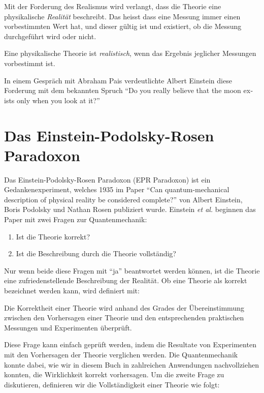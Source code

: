 \begin{refsection}
Mit der Forderung des Realismus wird verlangt, dass die Theorie eine
physikalische \emph{Realit\"at} beschreibt.
Das heisst dass eine Messung immer einen vorbestimmten Wert hat, und dieser
g\"ultig ist und existiert, ob die Messung durchgef\"uhrt wird oder nicht.

\begin{definition}\label{def:bell:realismus}
    Eine physikalische Theorie ist \emph{realistisch}, wenn das Ergebnis
    jeglicher Messungen vorbestimmt ist.
\end{definition}

In einem Gespr\"ach mit Abraham Pais verdeutlichte Albert Einstein diese
Forderung mit dem bekannten Spruch
\foreignquote{english}{Do you really believe that the moon exists only when you look at it?}\cite{Bell:Pais1979}

\section{Das Einstein-Podolsky-Rosen Paradoxon\label{section:bell:epr}}
Das Einstein-Podolsky-Rosen Paradoxon (EPR Paradoxon) ist ein 
Gedankenexperiment, welches 1935 im Paper \cite{Bell:Einstein1935}
\enquote{Can quantum-mechanical description of physical reality be considered complete?}
von Albert Einstein, Boris Podolsky und Nathan Rosen publiziert wurde.
Einstein \emph{et al.} beginnen das Paper mit zwei Fragen zur
Quantenmechanik:

\begin{enumerate}
    \item Ist die Theorie korrekt?
    \item Ist die Beschreibung durch die Theorie vollst\"andig?
\end{enumerate}

Nur wenn beide diese Fragen mit \enquote{ja} beantwortet werden k\"onnen, 
ist die Theorie eine zufriedenstellende Beschreibung der Realit\"at.
Ob eine Theorie als korrekt bezeichnet werden kann, wird definiert mit:

\begin{definition}\label{def:bell:Korrektheit}
    Die Korrektheit einer Theorie wird anhand des Grades der \"Ubereinstimmung
    zwischen den Vorhersagen einer Theorie und den entsprechenden praktischen
    Messungen und Experimenten \"uberpr\"uft.
\end{definition}

Diese Frage kann einfach gepr\"uft werden, indem die Resultate von
Experimenten mit den Vorhersagen der Theorie verglichen werden. 
Die Quantenmechanik konnte dabei, wie wir in diesem Buch in zahlreichen
Anwendungen nachvollziehen konnten, die Wirklichkeit korrekt vorhersagen. 
Um die zweite Frage zu diskutieren, definieren wir die Vollst\"andigkeit einer
Theorie wie folgt:


\end{refsection}
